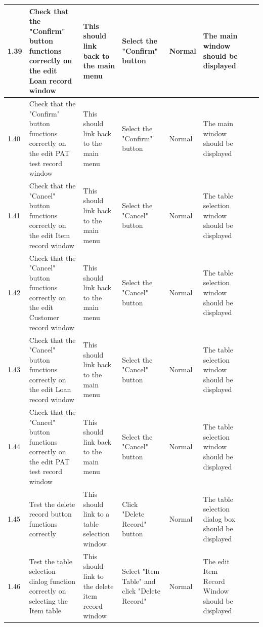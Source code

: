 \begin{landscape}
\begin{center}
\begin{longtable}{|p{1.5cm}|p{2cm}|p{3cm}|p{2cm}|p{2cm}|p{2.5cm}|p{2cm}|p{2cm}|}
        1.39 & Check that the "Confirm" button functions correctly on the edit Loan record window & This should link back to the main menu & Select the "Confirm" 
        button & Normal & The main window should be displayed & & \\ \hline
        
        1.40 & Check that the "Confirm" button functions correctly on the edit PAT test record window & This should link back to the main menu & Select the "Confirm" 
        button & Normal & The main window should be displayed & & \\ \hline
        
        1.41 & Check that the "Cancel" button functions correctly on the edit Item record window & This should link back to the main menu & Select the "Cancel" 
        button & Normal & The table selection window should be displayed & & \\ \hline
        
        1.42 & Check that the "Cancel" button functions correctly on the edit Customer record window & This should link back to the main menu & Select the "Cancel" 
        button & Normal & The table selection window should be displayed & & \\ \hline
        
        1.43 & Check that the "Cancel" button functions correctly on the edit Loan record window & This should link back to the main menu & Select the "Cancel" 
        button & Normal & The table selection window should be displayed & & \\ \hline
        
        1.44 & Check that the "Cancel" button functions correctly on the edit PAT test record window & This should link back to the main menu & Select the "Cancel" 
        button & Normal & The table selection window should be displayed & & \\ \hline
        
        1.45 & Test the delete record button functions correctly & This should link to a table selection window & Click "Delete Record" button & Normal & The table
        selection dialog box should be displayed & & \\ \hline 
        
        1.46 & Test the table selection dialog function correctly on selecting the Item table & This should link to the delete item record window & Select "Item Table" 
        and click "Delete Record" & Normal & The edit Item Record Window should be displayed & & \\ \hline
        

\end{longtable}
\end{center}
\end{landscape}
